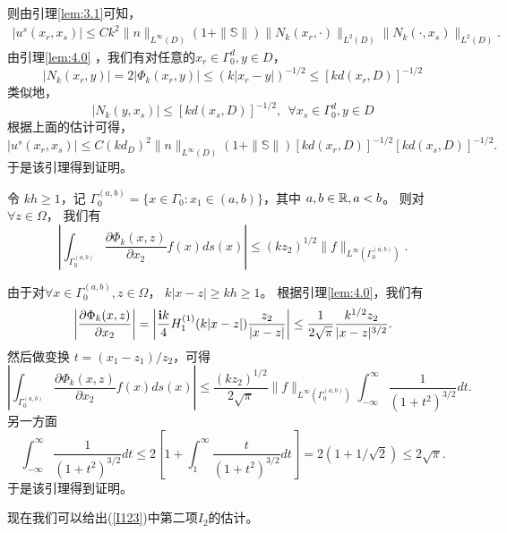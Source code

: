 则由引理\ref{lem:3.1}可知，
\begin{eqnarray*}
|u^s(x_r,x_s)|\leq Ck^2\|n\|_{L^\infty(D)}(1+\|\mathbb{S}\|)\|N_k(x_r,\cdot)\|_{L^2(D)}\|N_k(\cdot,x_s)\|_{L^2(D)}.
\end{eqnarray*}
由引理\ref{lem:4.0} ，我们有对任意的$x_r\in\Gamma_0^d,y\in D$，
\begin{equation*}
|N_k(x_r,y)|=2|\Phi_k(x_r,y)|\leq (k|x_r-y|)^{-1/2}
\leq [kd(x_r,D)]^{-1/2}
\end{equation*}
类似地，
\begin{equation*}
  |N_k(y,x_s)|\leq [kd(x_s,D)]^{-1/2},\ \ \forall x_s\in\Gamma_0^d,y\in D
\end{equation*}
根据上面的估计可得，
\begin{equation*}
|u^s(x_r,x_s)|\leq C(kd_D)^2\|n\|_{L^\infty(D)}(1+\|\mathbb{S}\|)[kd(x_r,D)]^{-1/2}[kd(x_s,D)]^{-1/2}.
\end{equation*}
于是该引理得到证明。
\finproof
\begin{lemma}\label{lem:new}
令 $kh\geq 1$，记 $\Gamma_0^{(a,b)}=\{x\in\Gamma_0:x_1\in (a,b)\}$，其中 $a,b\in\mathbb{R}, a<b$。
则对 $\forall z\in\Omega$， 我们有
\begin{equation*}
\left|\int_{\Gamma_0^{(a,b)}}\frac{\partial\Phi_k(x,z)}{\partial x_2}f(x)ds(x)\right|\leq (kz_2)^{1/2}\|f\|_{L^\infty(\Gamma_0^{(a,b)})}.
\end{equation*}
\end{lemma}
\debproof
由于对$\forall x\in\Gamma_0^{(a,b)},z\in\Omega$， $k|x-z|\geq kh\ge 1$。 根据引理\ref{lem:4.0}，我们有
\begin{equation}\label{b2}
\left|\frac{\partial\Phi_k(x,z)}{\partial x_2}\right|=\left|\frac{\mathbf{i} k}{4}H^{(1)}_1(k|x-z|)  \frac{z_2}{|x-z|}\right|\leq \frac 1{2\sqrt{\pi}}\frac{k^{1/2}z_2}{|x-z|^{3/2}}.
\end{equation}
然后做变换 $t=(x_1-z_1)/z_2$，可得
\begin{equation*}
\left|\int_{\Gamma_0^{(a,b)}}\frac{\partial\Phi_k(x,z)}{\partial x_2}f(x)ds(x)\right|\leq\frac{(kz_2)^{1/2}}{2\sqrt\pi}\|f\|_{L^\infty(\Gamma_0^{(a,b)})}\int^\infty_{-\infty}\frac 1{(1+t^2)^{3/2}}dt.
\end{equation*}
另一方面
\begin{equation*}
\int^\infty_{-\infty}\frac 1{(1+t^2)^{3/2}}dt\leq 2\left[1+\int^\infty_1\frac{t}{(1+t^2)^{3/2}}dt\right]=2(1+1/\sqrt 2)\leq 2\sqrt\pi.
\end{equation*}
于是该引理得到证明。
\finproof

现在我们可以给出(\ref{I123})中第二项$I_2$的估计。

